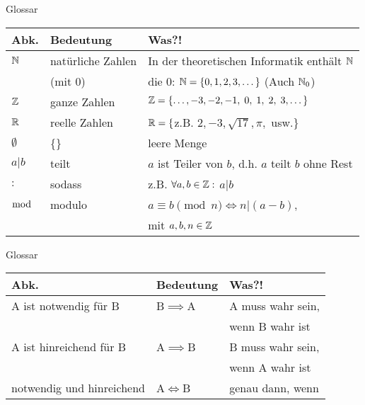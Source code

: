 %
%
%
%

\begin{frame}[fragile]{Glossar}
	\small
	\begin{tabular}{p{} p{} p{}}
		\toprule
		Abk.&Bedeutung&Was?!\\
		\midrule
		$\mathbb{N}$&natürliche Zahlen&In der theoretischen Informatik enthält $\mathbb{N}$ \\ 
		&(mit $0$)&die $0$: $\mathbb{N}=\{0,1,2,3,\dots\}$ (Auch $\mathbb{N}_0$)\\
		$\mathbb{Z}$&ganze Zahlen& $\mathbb{Z}=\{\dots,-3,-2,-1,\;0,\;1,\;2,\;3,\dots\}$\\
		$\mathbb{R}$&reelle Zahlen& $\mathbb{R}=\{$z.B. $ 2,-3,\sqrt{17},\pi,$ usw.$\}$\\
		$\emptyset$&\{\}&leere Menge\\
		$a|b$&teilt& $a$ ist Teiler von $b$, d.h. $a$ teilt $b$ ohne Rest\\
		$:$&sodass&z.B. $\forall a,b\in\mathbb{Z}:$ $a|b$\\
		$\bmod$&modulo& $a\equiv b \pmod n \iff n|(a-b)$,\\
		&& mit $a,b,n\in\mathbb{Z}$\\
		\bottomrule
	\end{tabular}
\end{frame}

\begin{frame}[fragile]{Glossar}
	\small
	\begin{tabular}{p{} p{} p{}}
		\toprule
		Abk.&Bedeutung&Was?!\\
		\midrule
		A ist notwendig für B&B$\implies$A&A muss wahr sein,\\
		&&wenn B wahr ist\\
		A ist hinreichend für B&A$\implies$B&B muss wahr sein,\\
		&&wenn A wahr ist\\
		notwendig und hinreichend&A$\iff$B&genau dann, wenn\\
		\bottomrule
	\end{tabular}
\end{frame}